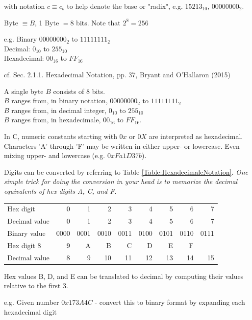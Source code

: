 \documentclass[10pt]{amsart}
\begin{document}
with notation $c \equiv c_b$ to help denote the base or "radix", e.g. $15213_{10}$, $00000000_2$.

Byte $\equiv B$, 1 Byte $ = 8$ bits. Note that $2^8 = 256$

e.g. Binary $00000000_2$ to $11111111_2$ \\
Decimal: $0_{10}$ to $255_{10}$ \\
Hexadecimal: $00_{16}$ to $FF_{16}$

cf. Sec. 2.1.1. Hexadecimal Notation, pp. 37, Bryant and O'Hallaron (2015) \cite{BrOH2016}

A single byte $B$ consists of 8 bits. \\
$B$ ranges from, in binary notation, $00000000_2$ to $11111111_2$ \\
$B$ ranges from, in decimal integer, $0_{10}$ to $255_{10}$ \\
$B$ ranges from, in hexadecimale, $00_{16}$ to ${FF}_{16}$. 

In C, numeric constants starting with $0x$ or $0X$ are interpreted as hexadecimal. Characters 'A' through 'F' may be written in either upper- or lowercase. Even mixing upper- and lowercase (e.g. $0xFa1D37b$).

Digits can be converted by referring to Table \ref{Table:HexadecimaleNotation}. \emph{One simple trick for doing the conversion in your head is to memorize the decimal equivalents of hex digits A, C, and F}.
	
	\begin{center}
		\label{Table:HexadecimaleNotation}
		\begin{tabular}{ l | r | r | r | r | r | r | r | r | }
			\hline
			Hex digit & 0 & 1 & 2 & 3 & 4 & 5 & 6 & 7 \\
			Decimal value & 0 & 1 & 2 & 3 & 4 & 5 & 6 & 7 \\
			Binary value & 0000 & 0001 & 0010 & 0011 & 0100 & 0101 & 0110 & 0111 \\
			Hex digit 8 & 9 & A & B & C & D & E & F \\
			Decimal value & 8 & 9 & 10 & 11 & 12 & 13 & 14 & 15 \\
			\hline
		\end{tabular}
	\end{center}

Hex values B, D, and E can be translated to decimal by computing their values relative to the first 3.

e.g. Given number $0x173A4C$ - convert this to binary format by expanding each hexadecimal digit
\end{document}
